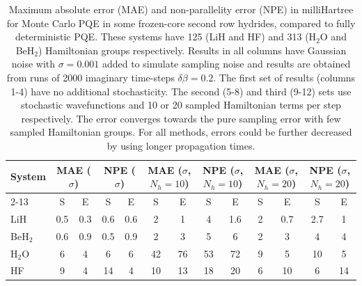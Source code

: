 \documentclass[%
 reprint,
 amsmath,amssymb,
 aps,
]{revtex4-2}
\begin{document}
{\begin{table}
    \centering
    \caption{\small \justifying Maximum absolute error (MAE) and non-parallelity error (NPE) in milliHartree for Monte Carlo PQE in some frozen-core second row hydrides, compared to fully deterministic PQE. These systems have 125 (LiH and HF) and 313 (H$_2$O and BeH$_2$) Hamiltonian groups respectively. Results in all columns have Gaussian noise with $\sigma = 0.001$ added to simulate sampling noise and results are obtained from runs of 2000 imaginary time-steps $\delta \beta = 0.2$. The first set of results (columns 1-4) have no additional stochasticity. The second (5-8) and third (9-12) sets use stochastic wavefunctions and 10 or 20 sampled Hamiltonian terms per step respectively. The error converges towards the pure sampling error with few sampled Hamiltonian groups. For all methods, errors could be further decreased by using longer propagation times.}
    \label{tab:hydrides}
    \begin{tabular}{l||c|c|c|c||c|c|c|c||c|c|c|c}
      \multirow{2}{*}{System} &  \multicolumn{2}{c|}{MAE ($\sigma$)} & \multicolumn{2}{c||}{NPE ($\sigma$)} & \multicolumn{2}{c|}{MAE ($\sigma$, $N_h = 10$)} & \multicolumn{2}{c||}{NPE ($\sigma$, $N_h = 10$)} & \multicolumn{2}{c|}{MAE ($\sigma$, $N_h = 20$)} &\multicolumn{2}{c}{NPE ($\sigma$, $N_h = 20$)}\\
      \cline{2-13}
      & S & E& S & E& S & E& S & E& S & E& S & E\\
      \hline
        LiH & 0.5 & 0.3 & 0.6 & 0.6 & \hspace*{5mm}2\hspace*{5mm} & 1& \hspace*{5mm}4\hspace*{5mm} &1.6&\hspace*{5mm}2\hspace*{5mm} &0.7 &\hspace*{4mm}2.7\hspace*{4mm}&1\\
         BeH$_2$ & 0.6 & 0.9 & 0.5 & 0.9 & 2 & 3 & 5 & 6 &2&3&4&4 \\
         H$_2$O & 6 & 4 & 6& 6& 42 &76 & 53& 72&9&5& 10& 5 \\
         HF& 9 & 4& 14 & 4 & 10& 13& 18 & 20 & 6 & 10 & 6 &14\\
         \hline
    \end{tabular}
    
\end{table}

}
\end{document}
